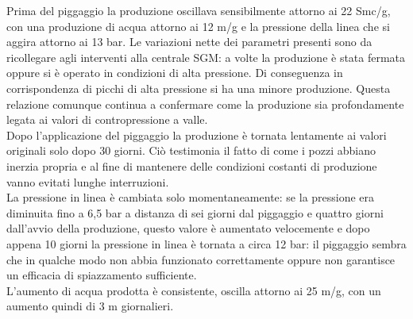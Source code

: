 Prima del piggaggio la produzione oscillava sensibilmente attorno ai 22 {Smc}/g, con una produzione di acqua attorno ai 12 m/g e la pressione della linea che si aggira attorno ai 13 bar. Le variazioni nette dei parametri presenti sono da ricollegare agli interventi alla centrale SGM: a volte la produzione è stata fermata oppure si è operato in condizioni di alta pressione. Di conseguenza in corrispondenza di picchi di alta pressione si ha una minore produzione. Questa relazione comunque continua a confermare come la produzione sia profondamente legata ai valori di contropressione a valle.\\
Dopo l'applicazione del piggaggio la produzione è tornata lentamente ai valori originali solo dopo 30 giorni. Ciò testimonia il fatto di come i pozzi abbiano inerzia propria e al fine di mantenere delle condizioni costanti di produzione vanno evitati lunghe interruzioni.\\
La pressione in linea è cambiata solo momentaneamente: se la pressione era diminuita fino a 6,5 bar a distanza di sei giorni dal piggaggio e quattro giorni dall'avvio della produzione, questo valore è aumentato velocemente e dopo appena 10 giorni la pressione in linea è tornata a circa 12 bar: il piggaggio sembra che in qualche modo non abbia funzionato correttamente oppure non garantisce un efficacia di spiazzamento sufficiente.\\
L'aumento di acqua prodotta è consistente, oscilla attorno ai 25 m/g, con un aumento quindi di 3 m giornalieri.\\



